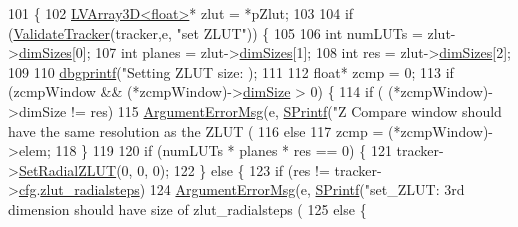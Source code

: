 \begin{DoxyCode}
101 \{
102     \hyperlink{struct_l_v_array3_d}{LVArray3D<float>}* zlut = *pZlut;
103 
104     \textcolor{keywordflow}{if} (\hyperlink{group__lab__functions_ga4d26499106cd9ee7e2197a1c785d2dc8}{ValidateTracker}(tracker,e, \textcolor{stringliteral}{"set ZLUT"})) \{
105 
106         \textcolor{keywordtype}{int} numLUTs = zlut->\hyperlink{struct_l_v_array3_d_a093817a34523cd25b5eb0294657674fd}{dimSizes}[0];
107         \textcolor{keywordtype}{int} planes = zlut->\hyperlink{struct_l_v_array3_d_a093817a34523cd25b5eb0294657674fd}{dimSizes}[1];
108         \textcolor{keywordtype}{int} res = zlut->\hyperlink{struct_l_v_array3_d_a093817a34523cd25b5eb0294657674fd}{dimSizes}[2];
109 
110         \hyperlink{utils_8cpp_a4a7132c90e490d24edecb391a754a9c0}{dbgprintf}(\textcolor{stringliteral}{"Setting ZLUT size: %
      );
111 
112         \textcolor{keywordtype}{float}* zcmp = 0;
113         \textcolor{keywordflow}{if} (zcmpWindow && (*zcmpWindow)->\hyperlink{struct_l_v_array_ab8675a32536e5d3f7ffc612977f88c33}{dimSize} > 0) \{
114             \textcolor{keywordflow}{if} ( (*zcmpWindow)->dimSize != res)
115                 \hyperlink{group__lab__functions_ga40d026eb54005767d41bee6c4a059e92}{ArgumentErrorMsg}(e, \hyperlink{utils_8cpp_aba26a6b64035ef7962a63b760dd9013e}{SPrintf}(\textcolor{stringliteral}{"Z Compare window should have the same
       resolution as the ZLUT (%
116             \textcolor{keywordflow}{else}
117                 zcmp = (*zcmpWindow)->elem;
118         \}
119 
120         \textcolor{keywordflow}{if} (numLUTs * planes * res == 0) \{
121             tracker->\hyperlink{class_queued_tracker_a77c3d8414993d2aa3ddfca4c8b40e71d}{SetRadialZLUT}(0, 0, 0);
122         \} \textcolor{keywordflow}{else} \{
123             \textcolor{keywordflow}{if} (res != tracker->\hyperlink{class_queued_tracker_afb847e7f49e0af6027d58af51d5914dc}{cfg}.\hyperlink{struct_q_trk_computed_config_ad1a121fa7d3152df6788ff285e4d2dc6}{zlut\_radialsteps})
124                 \hyperlink{group__lab__functions_ga40d026eb54005767d41bee6c4a059e92}{ArgumentErrorMsg}(e, \hyperlink{utils_8cpp_aba26a6b64035ef7962a63b760dd9013e}{SPrintf}(\textcolor{stringliteral}{"set\_ZLUT: 3rd dimension should have
       size of zlut\_radialsteps (%
125             \textcolor{keywordflow}{else} \{
}}}
\end{DoxyCode}
